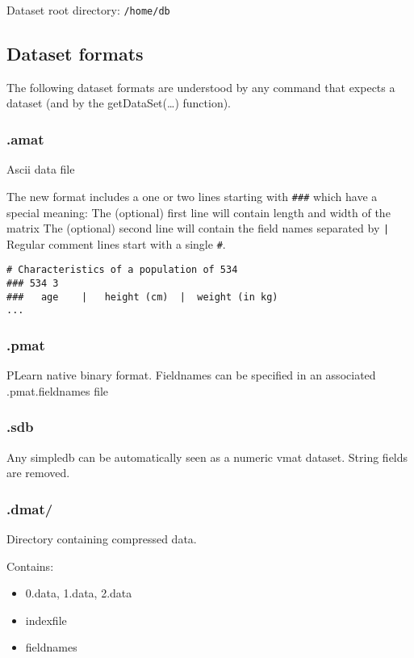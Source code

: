 \documentclass[11pt]{book}
\begin{document}
Dataset root directory:
{\tt /home/db}

\subsection{Dataset formats}

The following dataset formats are understood by any command that expects a dataset (and by the getDataSet(\ldots) function).

\subsubsection{.amat}

Ascii data file

The new format includes a one or two lines starting with \verb!###! which have a special meaning:  
The (optional) first line will contain length and width of the matrix
The (optional) second line will contain the field names separated by \verb!|!
Regular comment lines start with a single \verb!#!.

\begin{verbatim}
# Characteristics of a population of 534
### 534 3
###   age    |   height (cm)  |  weight (in kg) 
...
\end{verbatim}

\subsubsection{.pmat}

PLearn native binary format.
Fieldnames can be specified in an associated .pmat.fieldnames file

\subsubsection{.sdb}

Any simpledb can be automatically seen as a numeric vmat dataset. 
String fields are removed.

\subsubsection{.dmat/}

Directory containing compressed data.

Contains:
\begin{itemize}
\item 0.data, 1.data, 2.data
\item indexfile
\item fieldnames
\end{itemize}
\end{document}
